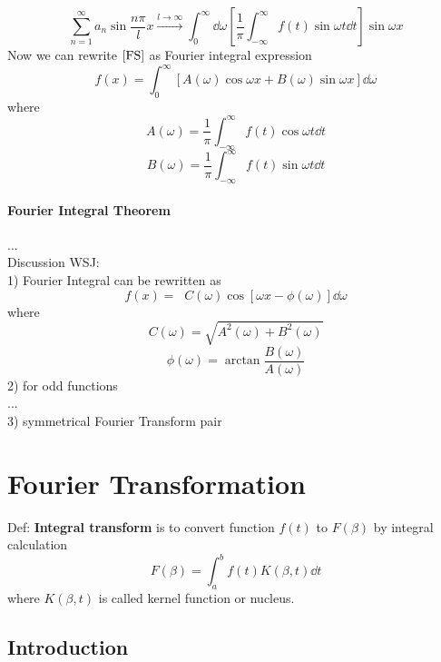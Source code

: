 \documentclass[UTF8]{ctexart} %
\DeclareMathOperator{\intinf}{\int_0^\infty}
\numberwithin{equation}{section}
\begin{document}
\begin{equation}\label{key}
\sum_{n=1}^\infty a_n\sin \dfrac{n\pi}{l}x \xrightarrow{l\rightarrow\infty}\int_0^\infty \dd \omega \left[\dfrac{1}{\pi}\int_{-\infty}^\infty f(t)\sin\omega t \dd t\right]\sin\omega x
\end{equation}
Now we can rewrite $\eqref{FS}$ as Fourier integral expression
\begin{equation}\label{key}
f(x)=\int_0^\infty[A(\omega)\cos\omega x+B(\omega)\sin\omega x]\dd \omega
\end{equation}
where
\begin{equation}\label{key}
A(\omega)=\dfrac{1}{\pi}\int_{-\infty}^\infty f(t)\cos\omega t \dd t
\end{equation}
\begin{equation}\label{key}
B(\omega)=\dfrac{1}{\pi}\int_{-\infty}^\infty f(t)\sin\omega t \dd t
\end{equation}

\paragraph{Fourier Integral Theorem}
...\\

Discussion WSJ:\\
1) Fourier Integral can be rewritten as
\begin{equation}\label{key}
f(x) = \intinf C(\omega)\cos [\omega x - \phi(\omega)]\dd\omega
\end{equation}
where
\begin{equation}\label{key}
C(\omega) = \sqrt{A^2(\omega) + B^2(\omega)}
\end{equation}
\begin{equation}\label{key}
\phi(\omega) = \arctan\dfrac{B(\omega)}{A(\omega)}
\end{equation}
2) for odd functions\\
...\\
3) symmetrical Fourier Transform pair
\section{Fourier Transformation}
Def: \textbf{Integral transform} is to convert function $f(t)$ to $F(\beta)$ by integral calculation
\begin{equation}\label{key}
F(\beta)=\int_a^b f(t)K(\beta,t)\dd t
\end{equation}
where $K(\beta,t)$ is called kernel function or nucleus.
\subsection{Introduction}
\end{document}
